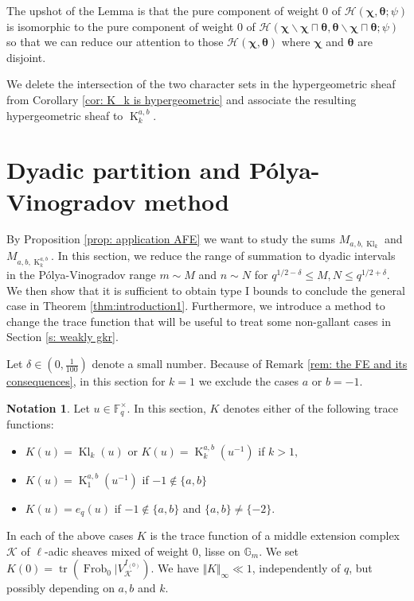 \documentclass[12pt]{amsart}
\theoremstyle{plain}
\theoremstyle{definition}
\newtheorem{notation}[thm]{Notation}
\theoremstyle{remark}
\numberwithin{equation}{section}
\newcommand{\FF}{\mathbb{F}}
\renewcommand{\leq}{\leqslant}
\DeclareMathOperator{\Kl}{Kl}%
\DeclareMathOperator{\K}{K} %
\begin{document}
The upshot of the Lemma is that the pure component of weight $0$ of $\mathcal{H}(\bm{\chi},\bm{\theta};\psi)$ is isomorphic to the pure component of weight $0$ of $\mathcal{H}(\bm{\chi}\smallsetminus\bm{\chi}\sqcap\bm{\theta},\bm{\theta}\smallsetminus\bm{\chi}\sqcap\bm{\theta};\psi)$ so that we can reduce our attention to those $\mathcal{H}(\bm{\chi},\bm{\theta})$ where $\bm{\chi}$ and $\bm{\theta}$ are disjoint. 

We delete the intersection of the two character sets in the hypergeometric sheaf from Corollary \ref{cor: K_k is hypergeometric} and associate the resulting hypergeometric sheaf to $\K_k^{a,b}$.




 





\section{Dyadic partition and P\'olya-Vinogradov method} \label{s: dyadic partition and poly vinogradov}
By Proposition \ref{prop: application AFE} we want to study the sums $M_{a,b,\Kl_k}$ and $M_{a,b,\K_k^{a,b}}$. In this section, we reduce the range of summation to dyadic intervals in the P\'olya-Vinogradov range $m\sim M$ and $n\sim N$ for $q^{1/2-\delta}\leq M,N\leq q^{1/2+\delta}$. We then show that it is sufficient to obtain type I bounds to conclude the general case in Theorem \ref{thm:introduction1}. Furthermore, we introduce a method to change the trace function that will be useful to treat some non-gallant cases in Section \ref{s: weakly gkr}.

Let $\delta \in (0,\frac{1}{100})$ denote a small number. Because of Remark \ref{rem: the FE and its consequences}, in this section for $k=1$ we exclude the cases $a$ or $b=-1$.
\begin{notation}\label{notation K}    
Let $u\in \FF_q^{\times}$. In this section, $K$ denotes either of the following trace functions: \begin{itemize}
     \item $K(u) = \Kl_k(u)$ or $K(u) = \K_k^{a,b}(u^{-1})$ if $k>1,$
     \item $K(u) = \K_1^{a,b}(u^{-1})$ if $-1\notin \{a,b\}$ 
     \item $K(u)=e_q(u)$ if $-1\notin \{a,b\}$ and $\{a,b\} \neq \{-2\}.$ 
 \end{itemize} 
 In each of the above cases $K$ is the trace function of a middle extension complex $\mathscr{K}$ of $\ell$-adic sheaves mixed of weight $0$, lisse on $\mathbb{G}_m$. We set  $K(0) = \operatorname{tr}(\operatorname{Frob}_0|V^{I_{(0)}}_{\mathscr{K}})$. We have $\Vert K\Vert_\infty \ll 1$, independently of $q$, but possibly depending on $a,b$ and $k$. 

\end{notation}
\end{document}
